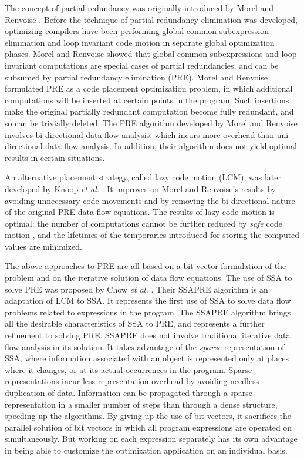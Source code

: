 The concept of partial redundancy was originally introduced by Morel and 
Renvoise \cite{MR79}.  Before the technique of partial redundancy 
elimination was developed, optimizing compilers have been performing
global common subexpression elimination and loop invariant code motion in
separate global optimization phases.  Morel and Renvoise showed that
global common subexpressions and loop-invariant computations are special
cases of partial redundancies, and can be subsumed by partial redundancy
elimination (PRE).  Morel and Renvoise formulated PRE as a code placement
optimization problem, in which additional computations will be inserted at
certain points in the program.  Such insertions make the original
partially redundant computation become fully redundant, and so can be
trivially deleted.  The PRE algorithm developed by Morel and Renvoise
involves bi-directional data flow analysis, which incurs more overhead
than uni-directional data flow analysis.  In addition, their algorithm
does not yield optimal results in certain situations.

An alternative placement strategy, called lazy code motion (LCM), was later 
developed by Knoop {\it et al.} \cite{Knoop92}\cite{Knoop94}.  It improves on
Morel and Renvoise's results by avoiding unnecessary code movements and by
removing the bi-directional nature of the original PRE data flow equations.
The results of lazy code motion is optimal: the number of computations cannot
be further reduced by \emph{safe} code motion \cite{Kennedy72}, and the
lifetimes of the temporaries introduced for storing the computed values
are minimized.

The above approaches to PRE are all based on a bit-vector formulation of the
problem and on the iterative solution of data flow equations.
The use of SSA to solve PRE was proposed by Chow {\it et al.} 
\cite{Chow97}\cite{Kennedy99}.  Their SSAPRE algorithm is an adaptation of LCM
to SSA.  It represents the first use of SSA to solve data flow problems
related to expressions in the program.  The SSAPRE algorithm brings all
the desirable characteristics of SSA to PRE, and represents a further
refinement to solving PRE.  SSAPRE does not involve traditional iterative
data flow analysis in its solution.  It takes advantage of the \emph{sparse}
representation of SSA, where information associated with an object is
represented only at places where it changes, or at its actual occurrences
in the program.  Sparse representations incur less representation
overhead by avoiding needless duplication of data.  Information can be
propagated through a sparse representation in a smaller number of steps
than through a dense structure, speeding up the algorithms.  By giving up
the use of bit vectors, it sacrifices the parallel solution of bit vectors
in which all program expressions are operated on simultaneously.  But working
on each expression separately has its own advantage in being able to
customize the optimization application on an individual basis.

